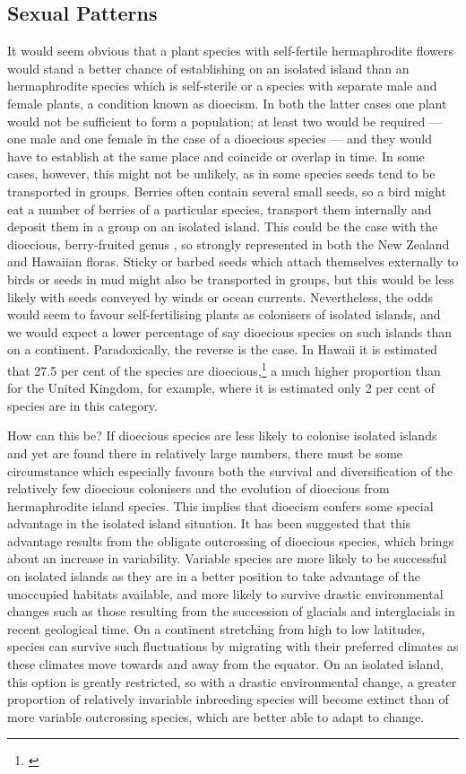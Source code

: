 \subsection{Sexual Patterns}

It would seem obvious that a plant species with self-fertile hermaphrodite flowers would stand a better chance of establishing on an isolated island than an hermaphrodite species which is self-sterile or a species with separate male and female plants, a condition known as dioecism.
In both the latter cases one plant would not be sufficient to form a population; at least two would be required --- one male and one female in the case of a dioecious species --- and they would have to establish at the same place and coincide or overlap in time.
In some cases, however, this might not be unlikely, as in some species seeds tend to be transported in groups.
Berries often contain several small seeds, so a bird might eat a number of berries of a particular species, transport them internally and deposit them in a group on an isolated island.
This could be the case with the dioecious, berry-fruited genus , so strongly represented in both the New Zealand and Hawaiian floras.
Sticky or barbed seeds which attach themselves externally to birds or seeds in mud might also be transported in groups, but this would be less likely with seeds conveyed by winds or ocean currents.
Nevertheless, the odds would seem to favour self-fertilising plants as colonisers of isolated islands, and we would expect a lower percentage of say dioecious species on such islands than on a continent.
Paradoxically, the reverse is the case.
In Hawai{\okina}i it is estimated that 27.5 per cent of the species are dioecious,\footnote{\cite{carlquist1970hawaii}} a much higher proportion than for the United Kingdom, for example, where it is estimated only 2 per cent of species are in this category.

How can this be? If dioecious species are less likely to colonise isolated islands and yet are found there in relatively large numbers, there must be some circumstance which especially favours both the survival and diversification of the relatively few dioecious colonisers and the evolution of dioecious from hermaphrodite island species.
This implies that dioecism confers some special advantage in the isolated island situation.
It has been suggested that this advantage results from the obligate outcrossing of dioecious species, which brings about an increase in variability.
Variable species are more likely to be successful on isolated islands as they are in a better position to take advantage of the unoccupied habitats available, and more likely to survive drastic environmental changes such as those resulting from the succession of glacials and interglacials in recent geological time.
On a continent stretching from high to low latitudes, species can survive such fluctuations by migrating with their preferred climates as these climates move towards and away from the equator.
On an isolated island, this option is greatly restricted, so with a drastic environmental change, a greater proportion of relatively invariable inbreeding species will become extinct than of more variable outcrossing species, which are better able to adapt to change.

